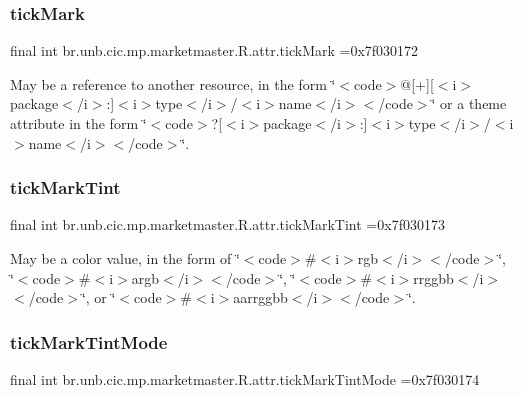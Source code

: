 \subsubsection{\texorpdfstring{tick\+Mark}{tickMark}}
{\footnotesize\ttfamily final int br.\+unb.\+cic.\+mp.\+marketmaster.\+R.\+attr.\+tick\+Mark =0x7f030172\hspace{0.3cm}{\ttfamily [static]}}

May be a reference to another resource, in the form \char`\"{}$<$code$>$@\mbox{[}+\mbox{]}\mbox{[}$<$i$>$package$<$/i$>$\+:\mbox{]}$<$i$>$type$<$/i$>$/$<$i$>$name$<$/i$>$$<$/code$>$\char`\"{} or a theme attribute in the form \char`\"{}$<$code$>$?\mbox{[}$<$i$>$package$<$/i$>$\+:\mbox{]}$<$i$>$type$<$/i$>$/$<$i$>$name$<$/i$>$$<$/code$>$\char`\"{}. \mbox{\label{classbr_1_1unb_1_1cic_1_1mp_1_1marketmaster_1_1R_1_1attr_a8a21d954a191ec396e6d18baccf4c56a}} 
\subsubsection{\texorpdfstring{tick\+Mark\+Tint}{tickMarkTint}}
{\footnotesize\ttfamily final int br.\+unb.\+cic.\+mp.\+marketmaster.\+R.\+attr.\+tick\+Mark\+Tint =0x7f030173\hspace{0.3cm}{\ttfamily [static]}}

May be a color value, in the form of \char`\"{}$<$code$>$\#$<$i$>$rgb$<$/i$>$$<$/code$>$\char`\"{}, \char`\"{}$<$code$>$\#$<$i$>$argb$<$/i$>$$<$/code$>$\char`\"{}, \char`\"{}$<$code$>$\#$<$i$>$rrggbb$<$/i$>$$<$/code$>$\char`\"{}, or \char`\"{}$<$code$>$\#$<$i$>$aarrggbb$<$/i$>$$<$/code$>$\char`\"{}. \mbox{\label{classbr_1_1unb_1_1cic_1_1mp_1_1marketmaster_1_1R_1_1attr_a909fd338c738f6f270128b1e0590a466}} 
\subsubsection{\texorpdfstring{tick\+Mark\+Tint\+Mode}{tickMarkTintMode}}
{\footnotesize\ttfamily final int br.\+unb.\+cic.\+mp.\+marketmaster.\+R.\+attr.\+tick\+Mark\+Tint\+Mode =0x7f030174\hspace{0.3cm}{\ttfamily [static]}}

